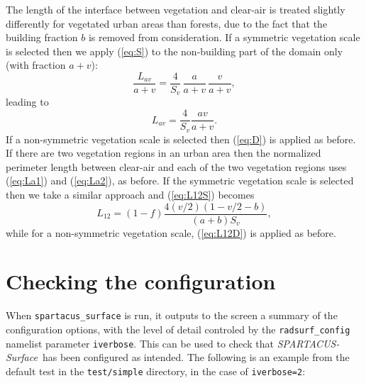 \documentclass[a4,oneside]{article}
\def\codesize{\small}
\def\spsurf{\emph{SPARTACUS-Surface}}
\def\code#1{{\codesize\texttt{#1}}}
\begin{document}
The length of the interface between vegetation and clear-air is
treated slightly differently for vegetated urban areas than forests,
due to the fact that the building fraction $b$ is removed from
consideration. If a symmetric vegetation scale is selected then we
apply (\ref{eq:S}) to the non-building part of the domain only (with
fraction $a+v$):
%
\begin{equation}
  \frac{L_{av}}{a+v}=\frac{4}{S_v}\,\frac{a}{a+v}\,\frac{v}{a+v},
\end{equation}
%
leading to
%
\begin{equation}
  L_{av}=\frac{4}{S_v}\frac{av}{a+v}.
\end{equation}
%
If a non-symmetric vegetation scale is selected then (\ref{eq:D}) is
applied as before.
%
If there are two vegetation regions in an urban area then the
normalized perimeter length between clear-air and each of the two
vegetation regions uses (\ref{eq:La1}) and (\ref{eq:La2}), as
before. If the symmetric vegetation scale is selected then we take a
similar approach and (\ref{eq:L12S}) becomes
%
\begin{equation}
  L_{12}=(1-f)\frac{4(v/2)(1-v/2-b)}{(a+b)S_v},
\end{equation}
%
while for a non-symmetric vegetation scale, (\ref{eq:L12D}) is applied
as before.

\section{Checking the configuration}
\label{sec:checking}
When \code{spartacus\_surface} is run, it outputs to the screen a
summary of the configuration options, with the level of detail
controled by the \code{radsurf\_config} namelist parameter
\code{iverbose}. This can be used to check that \spsurf\ has been
configured as intended.  The following is an example from the default
test in the \code{test/simple} directory, in the case of
\code{iverbose=2}:
\end{document}
